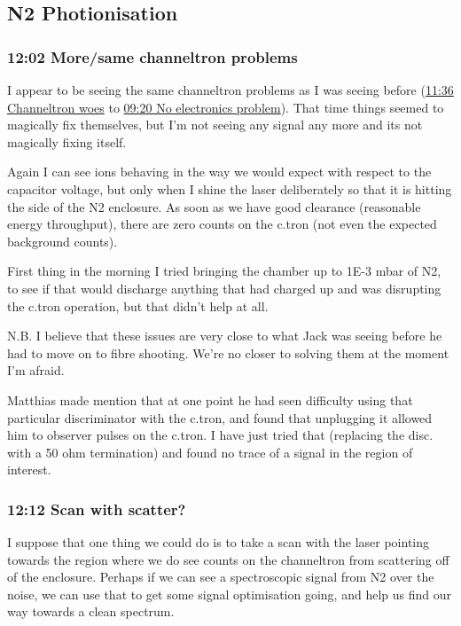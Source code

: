 \documentclass[11pt]{article}
\begin{document}
\subsection*{N2 Photionisation}
\label{sec-12-1}
\subsubsection*{12:02 More/same channeltron problems}
\label{sec-12-1-1}

I appear to be seeing the same channeltron problems as I was seeing
before (\hyperref[sec-8-1-1]{11:36 Channeltron woes} to \hyperref[sec-10-1-1]{09:20 No electronics problem}). That
time things seemed to magically fix themselves, but I'm not seeing any
signal any more and its not magically fixing itself. 

Again I can see ions behaving in the way we would expect with respect
to the capacitor voltage, but only when I shine the laser deliberately
so that it is hitting the side of the N2 enclosure. As soon as we have
good clearance (reasonable energy throughput), there are zero counts
on the c.tron (not even the expected background counts).

First thing in the morning I tried bringing the chamber up to 1E-3
mbar of N2, to see if that would discharge anything that had charged
up and was disrupting the c.tron operation, but that didn't help at
all. 

N.B. I believe that these issues are very close to what Jack was
seeing before he had to move on to fibre shooting. We're no closer to
solving them at the moment I'm afraid. 

Matthias made mention that at one point he had seen difficulty using
that particular discriminator with the c.tron, and found that
unplugging it allowed him to observer pulses on the c.tron. I have
just tried that (replacing the disc. with a 50 ohm termination) and
found no trace of a signal in the region of interest. 
\subsubsection*{12:12 Scan with scatter?}
\label{sec-12-1-2}

I suppose that one thing we could do is to take a scan with the laser
pointing towards the region where we do see counts on the channeltron
from scattering off of the enclosure. Perhaps if we can see a
spectroscopic signal from N2 over the noise, we can use that to get
some signal optimisation going, and help us find our way towards a
clean spectrum.
\end{document}
